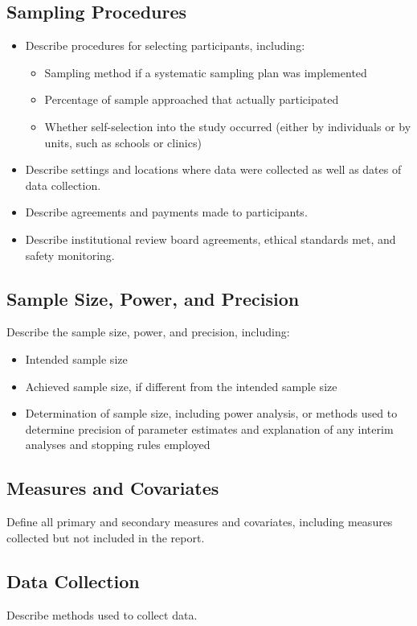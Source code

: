 \documentclass[acmsmall,screen,anonymous,review]{acmart}
\begin{document}
\subsection{Sampling Procedures}

\begin{itemize}
    \item Describe procedures for selecting participants, including:
    \begin{itemize}
        \item Sampling method if a systematic sampling plan was implemented
        \item Percentage of sample approached that actually participated
        \item Whether self-selection into the study occurred (either by individuals or by units, such as schools or clinics)
    \end{itemize}
    \item Describe settings and locations where data were collected as well as dates of data collection.
    \item Describe agreements and payments made to participants.
    \item Describe institutional review board agreements, ethical standards met, and safety monitoring.
\end{itemize}

\subsection{Sample Size, Power, and Precision}
Describe the sample size, power, and precision, including:
\begin{itemize}
    \item Intended sample size
    \item Achieved sample size, if different from the intended sample size
    \item Determination of sample size, including power analysis, or methods used to determine precision of parameter estimates and explanation of any interim analyses and stopping rules employed
\end{itemize}

\subsection{Measures and Covariates}
Define all primary and secondary measures and covariates, including measures collected but not included in the report.

\subsection{Data Collection}
Describe methods used to collect data.
\end{document}
